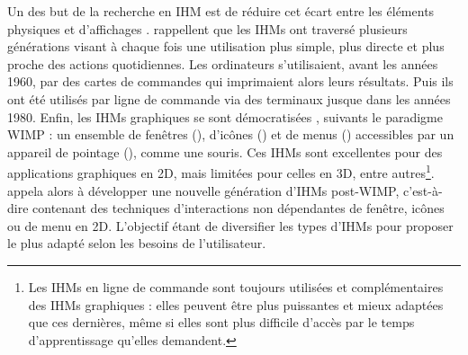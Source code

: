 Un des but de la recherche en IHM est de réduire cet écart entre les éléments physiques et d'affichages \cite{VanDam1997}. \cite{Jacob2008} rappellent que les IHMs ont traversé plusieurs générations visant à chaque fois une utilisation plus simple, plus directe et plus proche des actions quotidiennes. Les ordinateurs s'utilisaient, avant les années 1960, par des cartes de commandes qui imprimaient alors leurs résultats. Puis ils ont été utilisés par ligne de commande via des terminaux jusque dans les années 1980. Enfin, les IHMs graphiques se sont démocratisées , suivants le paradigme WIMP : un ensemble de fenêtres (), d'icônes () et de menus () accessibles par un appareil de pointage (), comme une souris. Ces IHMs sont excellentes pour des applications graphiques en 2D, mais limitées pour celles en 3D, entre autres\footnote{Les IHMs en ligne de commande sont toujours utilisées et complémentaires des IHMs graphiques : elles peuvent être plus puissantes et mieux adaptées que ces dernières, même si elles sont plus difficile d'accès par le temps d'apprentissage qu'elles demandent.}. \cite{VanDam1997} appela alors à développer une nouvelle génération d'IHMs post-WIMP, c'est-à-dire contenant des techniques d'interactions non dépendantes de fenêtre, icônes ou de menu en 2D. L'objectif étant de diversifier les types d'IHMs pour proposer le plus adapté selon les besoins de l'utilisateur.


